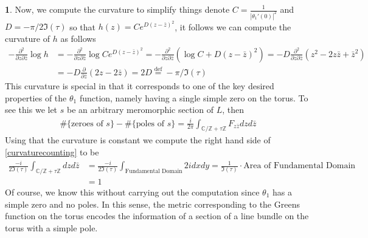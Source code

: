 \documentclass[10.5pt]{article}
\theoremstyle{definition}
\newtheorem{pb}{}
\newcommand{\set}[1]{\{#1\}}
\newcommand{\abs}[1]{\left\vert#1\right\vert}
\newcommand{\pzb}{\frac{\partial}{\partial \bar{z}}}
\newcommand{\pzpz}{\frac{\partial^2}{\partial z \partial \bar{z}}}
\begin{document}
\begin{pb}
        Now, we compute the curvature to simplify things denote \(C = \frac{1}{\abs{\theta_1'(0)}^2}\) and \(D = -\pi/2\Im(\tau)\) so that \(h(z) = Ce^{D(z-\bar{z})^2}\), it follows we can compute the curvature of \(h\) as follows
        \begin{align}
            -\pzpz \log h &= -\pzpz \log Ce^{D(z-\bar{z})^2} = -\pzpz\left(\log C + D(z - \bar{z})^2\right) = -D\pzpz (z^2 - 2z\bar{z} + \bar{z}^2) \\
            &= -D\pzb (2z - 2\bar{z}) = 2D \overset{\text{def}}{=} -\pi/\Im(\tau)
        \end{align}
        This curvature is special in that it corresponds to one of the key desired properties of the \(\theta_1\) function, namely having a single simple zero on the torus. To see this we let \(s\) be an arbitrary meromorphic section of \(L\), then
        \begin{align}
            \#\set{\text{zeroes of }s} - \#\set{\text{poles of }s} = \frac{i}{2\pi}\int_{\mathbb{C}/\mathbb{Z} + \tau \mathbb{Z}} F_{z\bar{z}}dzd\bar{z} \label{curvaturecounting}
        \end{align}
        Using that the curvature is constant we compute the right hand side of \eqref{curvaturecounting} to be 
        \begin{align}
            \frac{-i}{2\Im(\tau)}\int_{\mathbb{C}/\mathbb{Z} + \tau \mathbb{Z}}dzd\bar{z} &= \frac{-i}{2\Im(\tau)} \int_{\text{Fundamental Domain}} 2i dxdy = \frac{1}{\Im(\tau)}\cdot \text{Area of Fundamental Domain} \\
            &= 1
        \end{align}
        Of course, we know this without carrying out the computation since \(\theta_1\) has a simple zero and no poles. In this sense, the metric corresponding to the Greens function on the torus encodes the information of a section of a line bundle on the torus with a simple pole.
    \end{pb}
\end{document}
